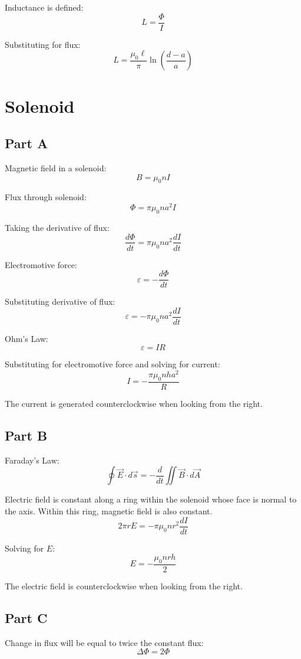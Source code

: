 \documentclass{article}
\begin{document}
Inductance is defined:
$$ L = \frac{\Phi}{I} $$

Substituting for flux:
$$ L = \frac{\mu_0 \ell}{\pi} \ln\left(\frac{d - a}{a}\right) $$

\section{Solenoid}

\subsection*{Part A}

Magnetic field in a solenoid:
$$ B = \mu_0 n I $$

Flux through solenoid:
$$ \Phi = \pi \mu_0 n a^2 I $$

Taking the derivative of flux:
$$ \frac{d\Phi}{dt} = \pi \mu_0 n a^2 \frac{dI}{dt} $$

Electromotive force:
$$ \varepsilon = -\frac{d\Phi}{dt} $$

Substituting derivative of flux:
$$ \varepsilon = -\pi \mu_0 n a^2 \frac{dI}{dt} $$

Ohm's Law:
$$ \varepsilon = IR $$

Substituting for electromotive force and solving for current:
$$ I = -\frac{\pi \mu_0 n h a^2}{R} $$

The current is generated counterclockwise when looking from the right.

\subsection*{Part B}

Faraday's Law:
$$ \oint \vec{E} \cdot d\vec{s} = -\frac{d}{dt}\iint \vec{B} \cdot d\vec{A} $$

Electric field is constant along a ring within the solenoid whose face is normal
to the axis. Within this ring, magnetic field is also constant.
$$ 2 \pi r E = - \pi \mu_0 n r^2 \frac{dI}{dt} $$

Solving for $E$:
$$ E = -\frac{\mu_0 n r h}{2} $$

The electric field is counterclockwise when looking from the right.

\subsection*{Part C}

Change in flux will be equal to twice the constant flux:
$$ \Delta \Phi = 2 \Phi $$
\end{document}
